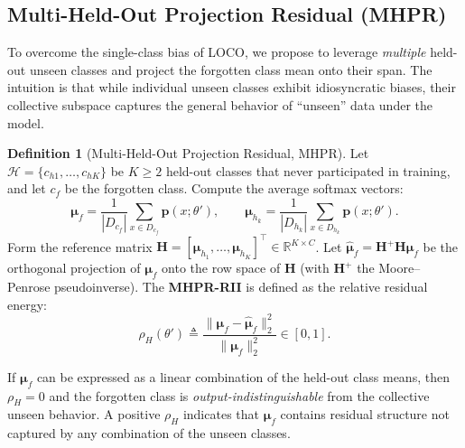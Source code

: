 \documentclass[journal]{IEEEtran}
\theoremstyle{definition}
\newtheorem{definition}[theorem]{Definition}
\newcommand{\coloneqq}{\triangleq}
\begin{document}
\subsection{Multi-Held-Out Projection Residual (MHPR)}
\label{sec:mhpr}

To overcome the single-class bias of LOCO, we propose to leverage \emph{multiple} held-out unseen classes and project the forgotten class mean onto their span. The intuition is that while individual unseen classes exhibit idiosyncratic biases, their collective subspace captures the general behavior of ``unseen'' data under the model.

\begin{definition}[Multi-Held-Out Projection Residual, MHPR]
\label{def:mhpr}
Let $\mathcal{H} = \{c_{h1},\dots,c_{hK}\}$ be $K \ge 2$ held-out classes that never participated in training, and let $c_f$ be the forgotten class. Compute the average softmax vectors:
\begin{equation}
\boldsymbol{\mu}_f = \frac{1}{|D_{c_f}|}\sum_{x \in D_{c_f}} \mathbf{p}(x;\theta'), \qquad
\boldsymbol{\mu}_{h_k} = \frac{1}{|D_{h_k}|}\sum_{x \in D_{h_k}} \mathbf{p}(x;\theta').
\end{equation}
Form the reference matrix $\mathbf{H} = [\boldsymbol{\mu}_{h_1},\dots,\boldsymbol{\mu}_{h_K}]^\top \in \mathbb{R}^{K\times C}$.
Let $\hat{\boldsymbol{\mu}}_f = \mathbf{H}^+ \mathbf{H} \boldsymbol{\mu}_f$ be the orthogonal projection of $\boldsymbol{\mu}_f$ onto the row space of $\mathbf{H}$ (with $\mathbf{H}^+$ the Moore--Penrose pseudoinverse). The \textbf{MHPR-RII} is defined as the relative residual energy:
\begin{equation}
\boxed{
\rho_H(\theta') \coloneqq \frac{\|\boldsymbol{\mu}_f - \hat{\boldsymbol{\mu}}_f\|_2^2}{\|\boldsymbol{\mu}_f\|_2^2} \in [0,1].
}
\end{equation}
\end{definition}

If $\boldsymbol{\mu}_f$ can be expressed as a linear combination of the held-out class means, then $\rho_H = 0$ and the forgotten class is \emph{output-indistinguishable} from the collective unseen behavior. A positive $\rho_H$ indicates that $\boldsymbol{\mu}_f$ contains residual structure not captured by any combination of the unseen classes.
\end{document}
